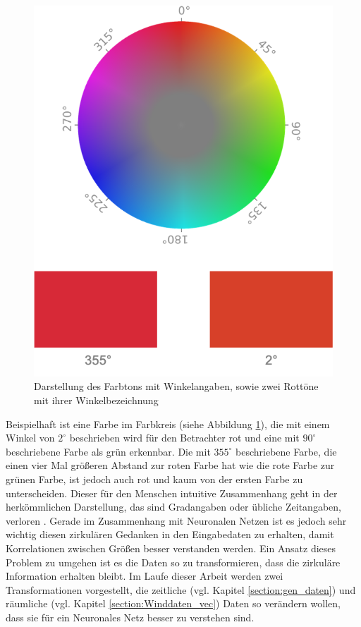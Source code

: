 \documentclass[
12pt, %
toc=listofnumbered, %
toc=chapterentrydotfill, %
numbers=noenddot, %
captions=tableheading, %
bibliography=numbered
]{scrreprt}
\begin{document}
\begin{figure}[tph]
	\begin{center}
		\includegraphics[width=0.5\linewidth]{./images/colorcircle.png}
		\caption{Darstellung des Farbtons mit Winkelangaben, sowie zwei Rottöne mit ihrer Winkelbezeichnung \cite{__Farbraum}}
		\label{fig:colorcircle}
	\end{center}
\end{figure}

Beispielhaft ist eine Farbe im Farbkreis (siehe Abbildung \ref{fig:colorcircle}), die mit einem Winkel von $2^\circ$ beschrieben wird für den Betrachter rot und eine mit $90^\circ$ beschriebene Farbe als grün erkennbar. Die mit $355^\circ$ beschriebene Farbe, die einen 
vier Mal größeren Abstand zur roten Farbe hat wie die rote Farbe zur grünen Farbe, ist jedoch auch rot und kaum von der ersten Farbe zu unterscheiden. 
Dieser für den Menschen intuitive Zusammenhang geht in der herkömmlichen Darstellung, das sind Gradangaben oder übliche Zeitangaben, verloren \cite{2016_London_EncodingCyclicalContinuous}. 
Gerade im Zusammenhang mit Neuronalen Netzen ist es jedoch sehr wichtig diesen zirkulären Gedanken in den Eingabedaten zu erhalten, damit Korrelationen zwischen Größen besser verstanden werden. 
Ein Ansatz dieses Problem zu umgehen ist es die Daten so zu transformieren, dass die zirkuläre Information erhalten bleibt. Im Laufe dieser Arbeit werden zwei Transformationen vorgestellt, die zeitliche (vgl. Kapitel \ref{section:gen_daten}) und räumliche (vgl. Kapitel \ref{section:Winddaten_vec}) Daten so verändern wollen, dass sie für ein Neuronales Netz besser zu verstehen sind.

\end{document}
